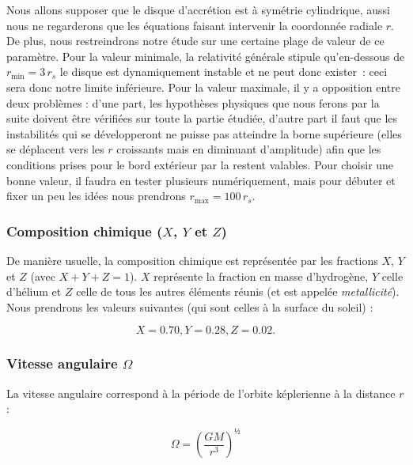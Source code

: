 Nous allons supposer que le disque d’accrétion est à symétrie cylindrique,
aussi nous ne regarderons que les équations faisant intervenir la coordonnée
radiale $r$. De plus, nous restreindrons notre étude sur une certaine plage de
valeur de ce paramètre. Pour la valeur minimale, la relativité générale stipule
qu’en-dessous de $r_\mathrm{min} = \num{3}\, r_s$ le disque est dynamiquement instable et ne
peut donc exister : ceci sera donc notre limite inférieure. Pour la valeur
maximale, il y a opposition entre deux problèmes : d’une part, les hypothèses
physiques que nous ferons par la suite doivent être vérifiées sur toute la
partie étudiée, d’autre part il faut que les instabilités qui se développeront
ne puisse pas atteindre la borne supérieure (elles se déplacent vers les $r$
croissants mais en diminuant d’amplitude) afin que les conditions prises pour
le bord extérieur par la restent valables. Pour choisir une bonne valeur, il
faudra en tester plusieurs numériquement, mais pour débuter et fixer un peu les
idées nous prendrons $r_\mathrm{max} = \num{100}\, r_s$.

\subsubsection{Composition chimique ($X$, $Y$ et $Z$)}

De manière usuelle, la composition chimique est représentée par les fractions
$X$, $Y$ et $Z$ (avec $X + Y + Z = 1$). $X$ représente la fraction en masse
d’hydrogène, $Y$ celle d’hélium et $Z$ celle de tous les autres éléments réunis
(et est appelée \textit{metallicité}). Nous prendrons les valeurs suivantes
(qui sont celles à la surface du soleil) :

\begin{equation}
    \label{eq:compo_chimique}
    X = \num{0.70}, Y = \num{0.28}, Z = \num{0.02}.
\end{equation}

\subsubsection{Vitesse angulaire $\Omega$}

La vitesse angulaire correspond à la période de l’orbite képlerienne à la distance $r$ :
 
\begin{equation}
    \label{eq:vitesse_angulaire}
    \Omega = \left( \frac{G M}{r^3} \right)^½
\end{equation}

